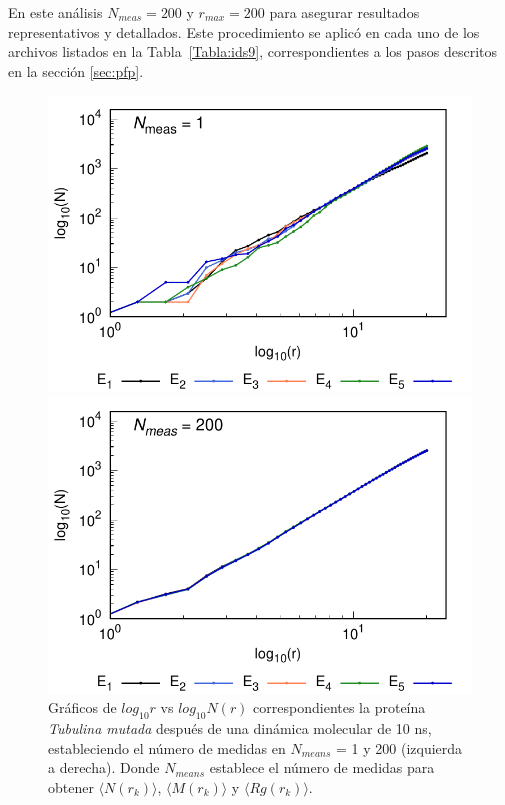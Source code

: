 	En este análisis $N_{meas} = 200 $ y $r_{max} = 200$ para asegurar resultados 
	representativos y detallados. Este procedimiento se aplic\'{o} en cada uno 
	de los archivos listados en la Tabla~\ref{Tabla:ids9}, correspondientes a 
	los pasos descritos en la secci\'{o}n \ref{sec:pfp}.
	

	\begin{figure}[H]
		\hspace{-0.3cm} 
		\begin{minipage}{0.49\textwidth}
			\centering
			\includegraphics[width=\linewidth,page=1]{graphs/PDBs/Tubb4/TubMutA=1.pdf}
		\end{minipage}
		\hspace{0.2cm}
		\begin{minipage}{0.49\textwidth}
			\centering
			\includegraphics[width=\linewidth,page=1]{graphs/PDBs/Tubb4/TubMutA=200.pdf}
		\end{minipage}
		
		\caption{
			Gr\'{a}ficos de $log_{10}r$ vs $log_{10}N(r)$ correspondientes la proteína \textit{Tubulina mutada} despu\'{e}s de una din\'{a}mica molecular de 10 ns, estableciendo el número de medidas en  $N_{means}$ = 1 y 200 (izquierda a derecha). Donde $N_{means}$ establece el número de medidas para obtener $\langle N(r_k) \rangle$, $\langle M(r_k) \rangle$ y $\langle Rg(r_k) \rangle$.}
		\label{fig:Nmeasp}
	\end{figure}
	
